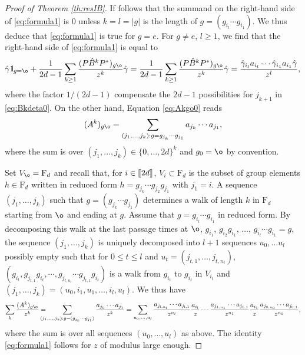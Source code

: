 \documentclass[11pt]{article}
\newcommand{\dF}{\mathrm{F}}
\newcommand{\1}{1\!\!{\sf I}}
\newcommand{\IND}{\1}
\newcommand{\INT}[1]{{{\left[\hspace{-1.4pt}\left[#1\right]\hspace{-1.4pt}\right]}}}
\begin{document}
\begin{proof}[Proof of Theorem \ref{th:resIB}]
If follows that the summand on the right-hand side of \eqref{eq:formula1} is $0$ unless $k = l  = |g|$ is the length of $g =  (g_{i_{l}}\cdots g_{i_1})$. We thus deduce that \eqref{eq:formula1} is true for $g = e$. For $g \ne e$,  $l \geq 1$, we find that the right-hand side of \eqref{eq:formula1} is equal to 
$$
  \hat \gamma \IND_{g = \o} + \frac{1}{2d-1}\sum_{k\geq 1}  \frac{(P \hat B^k P^*) _{g \o}}{z^k}  \hat \gamma = \frac{1}{2d-1} \sum_{k \geq 1}  \frac{(P \hat B^k P^*) _{g \o}}{z^k}  \hat \gamma = \frac{\hat \gamma_{i_{l}} a_{i_l}\cdots \hat \gamma_{i_1 } a_{i_1} \hat \gamma}{z^{l}},
$$
where the factor $1/(2d-1)$ compensate the $2d-1$ possibilities for $j_{k+1}$ in \eqref{eq:Bkdeta0}.
On the other hand, Equation \eqref{eq:Akgo0} reads 
\begin{equation*}
(A^k)_{g \o} = \sum_{(j_1,\ldots,j_k) :  g = g_{j_k}\cdots g_{j_1} }a_{j_k} \cdots a_{j_1},
\end{equation*}
where the sum is over $(j_1,\ldots,j_k) \in \{0,\ldots,2d\}^k$ and $g_0 = \o$ by convention.

Set $V_{\o} = \dF_d$ and recall that, for $i \in \INT{2d}$, $V_i \subset \dF_d$ is the subset of group elements $h \in \dF_d$ written in reduced form $h = g_{j_k} \cdots g_{j_2} g_{j_1}$ with $j_1 = i$. 
A sequence $(j_1, \ldots, j_k)$ such that $g  = (g_{j_k}\cdots g_{j_1}) $  determines a walk of length $k$ in $\dF_d$ starting from $\o$ and ending at $g$. Assume that $g = g_{i_l}\cdots g_{i_1}$ in reduced form. By decomposing this walk at the last passage times at $\o$, $g_{i_1}$, $g_{i_2} g_{i_1}$, $\ldots$, $g_{i_{l}}\cdots g_{i_1} = g$, the sequence $(j_1, \ldots, j_k)$ is uniquely decomposed into $l +1 $ sequences $u_0, \ldots u_l$ possibly empty such that for $0 \leq t \leq l$ and $u_t = (j_{t,1}, \ldots , j_{t,n_t})$, $(g_{i_t}, g_{j_{t,1}} g_{i_t}, \cdots , g_{j_{t,n_t}} \cdots g_{j_{t,1}} g_{i_t} )$ is a walk from $g_{i_{t}}$ to  $g_{i_{t}}$ in $V_{i_{t}}$ and $(j_1,\ldots,j_k) = (u_0,i_1, u_1 , \ldots, i_l, u_l)$. We thus have 
$$ \sum_k \frac{(A^k)_{g \o}}{z^k} = \hspace{-0.4cm}\sum_{(j_1,\ldots,j_k) :  g = (g_{j_k}\cdots g_{j_1}) } \frac{a_{j_k} \cdots a_{j_1}}{z^k} = \sum_{u_0,\ldots,u_l}  \frac{a_{j_{l,n_l}} \cdots a_{j_{l,1}}}{z^{n_l}}\frac{a_{i_l}}{z} \cdots \frac{a_{j_{1,n_1}} \cdots a_{j_{1,1}}}{z^{n_1}} \frac{a_{i_1}}{z} \frac{a_{j_{0,n_0}} \cdots a_{j_{0,1}}}{z^{n_0}},$$
where the sum is over all sequences $(u_0,\ldots,u_l)$ as above.  The identity \eqref{eq:formula1} follows
for $z$ of modulus large enough. \end{proof}
\end{document}
